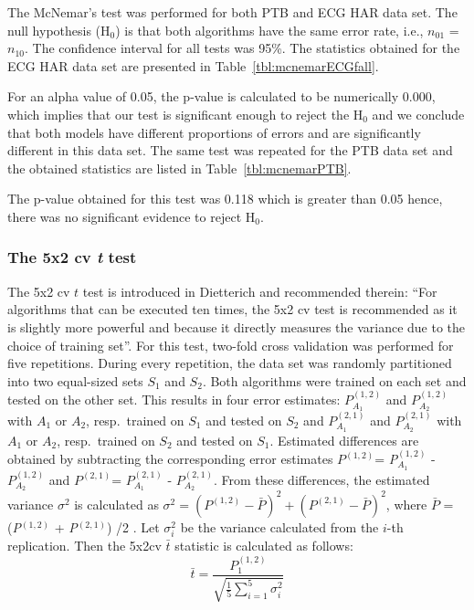 \documentclass{ieeeaccess}
\begin{document}
The McNemar's test was performed for both PTB and ECG HAR data set. The null hypothesis (H$_0$) is that both algorithms have the same error rate, i.e., $n_{01}$ = $n_{10}$. The confidence interval for all tests was 95\%. The statistics obtained for the ECG HAR data set are presented in Table~\ref{tbl:mcnemarECGfall}.

For an alpha value of 0.05, the p-value is calculated to be numerically 0.000, which implies that our test is significant enough to reject the H$_0$ and we conclude that both models have different proportions of errors and are significantly different in this data set. 
The same test was repeated for the PTB data set and the obtained statistics are listed in Table~\ref{tbl:mcnemarPTB}.

The p-value obtained for this test was 0.118 which is greater than 0.05 hence, there was no significant evidence to reject H$_0$.

\subsubsection{The 5x2 cv \emph{t} test}
The 5x2 cv $t$ test is introduced in Dietterich \cite{Dietterich} and recommended therein: ``For algorithms that can be executed ten times, the 5x2 cv test is recommended as it is slightly more powerful and because it directly measures the variance due to the choice of training set''.  For this test, two-fold cross validation was performed for five repetitions. During every repetition, the data set was randomly partitioned into two equal-sized sets $S_1$ and $S_2$. Both algorithms were trained on each set and tested on the other set. This results in four error estimates: $P_{A_1}^{(1,2)}$ and $P_{A_2}^{(1,2)}$ with $A_1$ or $A_2$, resp.\ trained on $S_1$ and tested on $S_2$ and $P_{A_1}^{(2,1)}$ and $P_{A_2}^{(2,1)}$ with $A_1$ or $A_2$, resp.\ trained on $S_2$ and tested on $S_1$. Estimated differences are obtained by subtracting the corresponding error estimates $P^{(1,2)}$= \emph{P}$_{A_1}^{(1,2)}$ - $P_{A_2}^{(1,2)}$ and $P^{(2,1)}$= $P_{A_1}^{(2,1)}$ - $P_{A_2}^{(2,1)}$. From these differences, the estimated variance $\sigma^2$ is calculated as $\sigma^2 = (P^{(1,2)} - \bar{P})^2+ (P^{(2,1)}- \bar{P})^2$, where \emph{$\bar{P}$} = (\emph{P}$^{(1,2)}$ + \emph{P}$^{(2,1)}$) /2 . Let $\sigma_i^{2}$ be the variance calculated from the $i$-th replication. Then the 5x2cv $\bar{t}$ statistic is calculated as follows:
\begin{equation*}
\bar{t}= \frac{P_1^{(1,2)}}{\sqrt{\frac{1}{5} \sum_{i=1}^{5} \sigma_{i}^{2}}}
\end{equation*}
\end{document}
